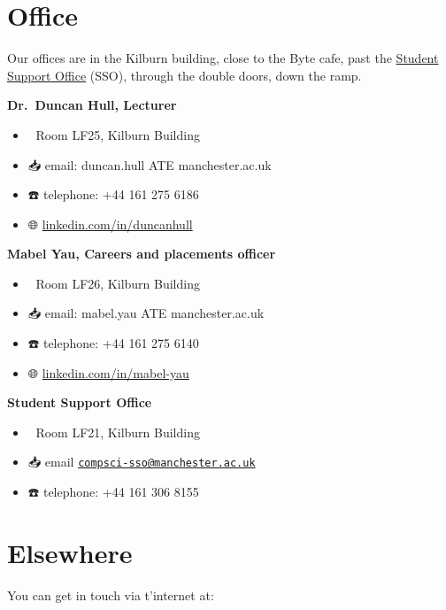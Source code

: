 \documentclass[12pt,]{book}
\providecommand{\tightlist}{%
  \setlength{\itemsep}{0pt}\setlength{\parskip}{0pt}}
\begin{document}
\hypertarget{office}{%
\section{Office}\label{office}}

Our offices are in the Kilburn building, close to the Byte cafe, past the \href{https://studentnet.cs.manchester.ac.uk/student-services/}{Student Support Office} (SSO), through the double doors, down the ramp.

\textbf{Dr.~Duncan Hull, Lecturer} 👨‍💻

\begin{itemize}
\tightlist
\item
  🏢 Room LF25, Kilburn Building
\item
  📥 email: duncan.hull ATE manchester.ac.uk
\item
  ☎️ telephone: +44 161 275 6186
\item
  🌐 \href{https://uk.linkedin.com/in/duncanhull}{linkedin.com/in/duncanhull}
\end{itemize}

\textbf{Mabel Yau, Careers and placements officer} 👩‍💻

\begin{itemize}
\tightlist
\item
  🏢 Room LF26, Kilburn Building
\item
  📥 email: mabel.yau ATE manchester.ac.uk
\item
  ☎️ telephone: +44 161 275 6140
\item
  🌐 \href{https://uk.linkedin.com/in/mabel-yau}{linkedin.com/in/mabel-yau}
\end{itemize}

\textbf{Student Support Office } 👨‍👩‍👧‍👦

\begin{itemize}
\tightlist
\item
  🏢 Room LF21, Kilburn Building
\item
  📥 email \href{mailto:compsci-sso@manchester.ac.uk}{\nolinkurl{compsci-sso@manchester.ac.uk}}
\item
  ☎️ telephone: +44 161 306 8155
\end{itemize}

\hypertarget{elsewhere}{%
\section{Elsewhere}\label{elsewhere}}

You can get in touch via t'internet at:
\end{document}
